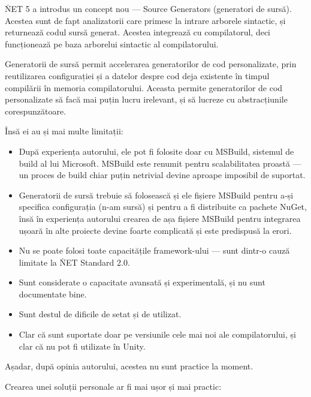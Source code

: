 \documentclass[a4paper,12pt]{report}
\begin{document}
\. NET 5 a introdus un concept nou --- Source Generators (generatori de sursă)\cite{source_generators}.
Acestea sunt de fapt analizatorii care primesc la intrare arborele sintactic, și returnează codul sursă generat.
Acestea integrează cu compilatorul, deci funcționează pe baza arborelui sintactic al compilatorului.

Generatorii de sursă permit accelerarea generatorilor de cod personalizate, prin reutilizarea configurației și a datelor despre cod deja existente în timpul compilării în memoria compilatorului.
Aceasta permite generatorilor de cod personalizate să facă mai puțin lucru irelevant, și să lucreze cu abstracțiunile corespunzătoare.

Însă ei au și mai multe limitații:

\begin{itemize}

  \item După experiența autorului, ele pot fi folosite doar cu MSBuild, sistemul de build al lui Microsoft.
  MSBuild este renumit pentru scalabilitatea proastă --- un proces de build chiar puțin netrivial devine aproape imposibil de suportat.

  \item Generatorii de sursă trebuie să folosească și ele fișiere MSBuild pentru a-și specifica configurația (n-am sursă) și pentru a fi distribuite ca pachete NuGet, 
    însă în experiența autorului crearea de așa fișiere MSBuild pentru integrarea ușoară în alte proiecte devine foarte complicată și este predispusă la erori.

  \item Nu se poate folosi toate capacitățile framework-ului --- sunt dintr-o cauză limitate la \. NET Standard 2.0.

  \item Sunt considerate o capacitate avansată și experimentală, și nu sunt documentate bine.

  \item Sunt destul de dificile de setat și de utilizat.
    
  \item Clar că sunt suportate doar pe versiunile cele mai noi ale compilatorului, și clar că nu pot fi utilizate în Unity.

\end{itemize}

Așadar, după opinia autorului, acestea nu sunt practice la moment.

Crearea unei soluții personale ar fi mai ușor și mai practic:
\end{document}

